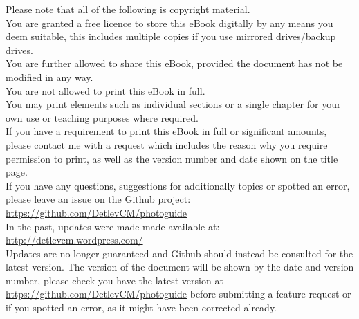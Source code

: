 \begin{center}
Please note that all of the following is copyright material.
\\
\vspace{10 mm}
You are granted a free licence to store this eBook digitally by any means you deem suitable, this includes multiple copies if you use mirrored drives/backup drives.
\\
You are further allowed to share this eBook, provided the document has not be modified in any way. 
\\
\vspace{5 mm}
You are not allowed to print this eBook in full.
\\
You may print elements such as individual sections or a single chapter for your own use or teaching purposes where required.
\\
If you have a requirement to print this eBook in full or significant amounts, please contact me with a request which includes the reason why you require permission to print, as well as the version number and date shown on the title page.
\\
\vspace{20 mm}
If you have any questions, suggestions for additionally topics or spotted an error, please leave an issue on the Github project:
\\
\href{https://github.com/DetlevCM/photoguide}{https://github.com/DetlevCM/photoguide}
\\
In the past, updates were made made available at:
\\
\href{http://detlevcm.wordpress.com/}{http://detlevcm.wordpress.com/}
\\
Updates are no longer guaranteed and Github should instead be consulted for the latest version.
\vspace{20 mm}
The version of the document will be shown by the date and version number, please check you have the latest version at \href{https://github.com/DetlevCM/photoguide}{https://github.com/DetlevCM/photoguide} before submitting a feature request or if you spotted an error, as it might have been corrected already. 
\end{center}
